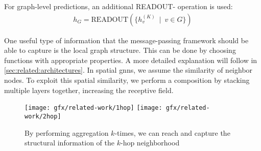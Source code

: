 For graph-level predictions, an additional READOUT- operation is used:
\begin{align*}
    h_{G} =\mathrm{READOUT}(\{h_{v}^{(K)}\ \mid \ v \in G\})
\end{align*}

One useful type of information that the message-passing framework should be able to capture is the local graph structure.
This can be done by choosing functions with appropriate properties.
A more detailed explanation will follow in \cref{sec:related:architectures}.
In spatial \acp{gnn}, we assume the similarity of neighbor nodes.
To exploit this spatial similarity, we perform a composition by stacking multiple layers together, increasing the receptive field.

\begin{figure}[ht]
    \centering
    \texttt{[image: gfx/related-work/1hop]}\hspace{1cm}
    \texttt{[image: gfx/related-work/2hop]}
    \caption{By performing aggregation $k$-times, we can reach and capture the
        structural information of the $k$-hop neighborhood}\label{fig:related:1hop}
\end{figure}


